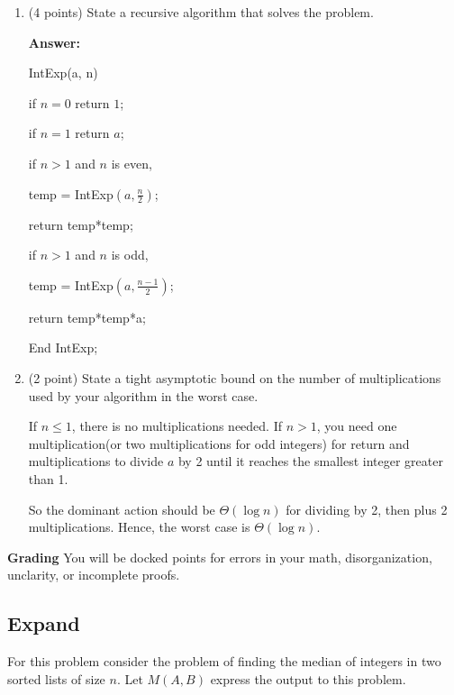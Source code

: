 \documentclass[paper=a4, fontsize=11pt]{scrartcl}
\newcommand\tab[1][0.6cm]{\hspace*{#1}}
\numberwithin{equation}{section}		%
\numberwithin{figure}{section}			%
\numberwithin{table}{section}				%
\begin{document}
\begin{enumerate}
\item (4 points) State a recursive algorithm that solves the problem.

\textbf{Answer:}

IntExp(a, n)

\tab if $n=0$ return $1$;

\tab if $n=1$ return $a$;

\tab if $n>1$ and $n$ is even,

\tab \tab temp = IntExp$(a, \frac{n}{2})$;

\tab \tab return temp*temp;

\tab if $n>1$ and $n$ is odd,

\tab \tab temp = IntExp$(a, \frac{n-1}{2})$;

\tab \tab return temp*temp*a;

End IntExp;


\item (2 point) State a tight asymptotic bound on the number of multiplications used by your algorithm in the worst case.

If $n \leq 1$, there is no multiplications needed. If $n > 1$, you need one multiplication(or two multiplications for odd integers) for return and multiplications to divide $a$ by 2 until it reaches the smallest integer greater than 1. 

So the dominant action should be $\Theta(\log n)$ for dividing by 2, then plus 2 multiplications. Hence, the worst case is $\Theta(\log n)$.






\end{enumerate}

\noindent\textbf{Grading} You will be docked points for errors in your math, disorganization, unclarity, or incomplete proofs. 

\subsection{Expand}

For this problem consider the problem of finding the median of integers in two sorted lists of size $n$.  Let $M(A,B)$ express the output to this problem. 
\end{document}
